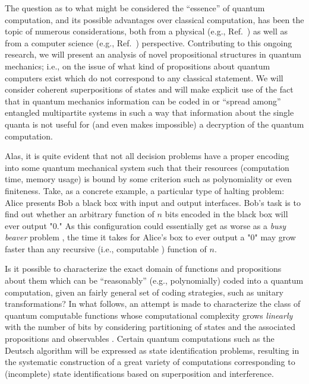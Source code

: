 The question as to what might be considered the ``essence'' of quantum computation,
and its possible advantages over classical computation, has been the topic of
numerous considerations, both from a physical
(e.g., Ref.~\cite{ekerj96,pres-97,pres-ln,nielsen-book,galindo-02,mermin-04,eisert-wolf-04})
as well as from a computer science
(e.g., Ref.~\cite{Gruska,benn:97,Ozhigov:1997,bbcmw-01,cleve-99,fortnov-03}) perspective.
Contributing to this ongoing research,
we will present an analysis of novel propositional structures
in quantum mechanics; i.e.,
on the issue of what kind of propositions about
quantum computers exist which do not correspond to any classical statement.
We will consider coherent superpositions of  states and will
make explicit use of the fact that in quantum mechanics information
can be coded in or ``spread among'' entangled multipartite systems in such a way that
information about the single quanta is not useful for (and even makes impossible)
a decryption of the quantum computation.


Alas, it is quite evident that not all decision problems
have a proper encoding
into some quantum mechanical system
such that their resources (computation time, memory usage) is bound by some
criterion such as polynomiality or even finiteness.
Take, as a concrete example, a particular type of halting problem:
Alice presents Bob a black box with input and output interfaces.
Bob's task is to find out whether an arbitrary function of $n$ bits encoded in the black box
will ever output "0."
As this configuration could essentially get as worse as a {\em busy beaver} problem
\cite{rado},
the time it takes for Alice's box to ever output a "0" may grow faster than
any recursive (i.e., computable \cite{rogers1,odi:89}) function of $n$.



Is it possible to
characterize the exact domain of functions
and propositions about them which can be ``reasonably''
(e.g., polynomially) coded into a quantum computation,
given an fairly general set of coding strategies, such as unitary transformations?
In what follows, an attempt is made to characterize the class of quantum computable functions whose
computational complexity grows {\em linearly} with the number of bits
by considering partitioning of states and the associated propositions and observables
\cite{zeil-99,DonSvo01,svozil-2002-statepart-prl,svozil-2003-garda}.
Certain quantum computations such as the Deutsch algorithm
will be expressed as state identification problems,
resulting in the systematic construction of a great variety of computations
corresponding to (incomplete) state identifications
based on superposition and interference.

